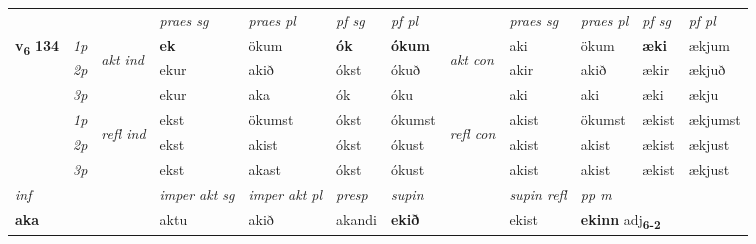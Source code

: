 \begin{longtable}[l]{X>{\footnotesize\itshape}llXXXXlXXXX}
 & &   & \textit{praes sg}  & \textit{praes pl}    & \textit{ pf sg} & \textit{pf pl} & & \textit{praes sg}  & \textit{praes pl}    & \textit{pf sg} & \textit{pf pl }  \\ \cmidrule{4-7} \cmidrule{9-12}
 \multirow{2}{*}{{{\textbf{v{\textsubscript{6}}} \Large{\textbf{134}}}}}  & 1p & \multirow{3}{*}{\begin{turn}{90}\textit{akt ind}\end{turn}} & \textbf{ek} & ökum & \textbf{ók} & \textbf{ókum} & \multirow{3}{*}{\begin{turn}{90}\textit{akt con}\end{turn}} &aki & ökum & \textbf{æki} & ækjum\\*
 & 2p &  &  ekur  & akið & ókst & ókuð & & akir & akið & ækir & ækjuð \\*
 & 3p &  & ekur & aka & ók & óku & & aki & aki& æki & ækju \\*
\cmidrule{4-7} \cmidrule{9-12}
 & 1p & \multirow{3}{*}{\begin{turn}{90}\textit{refl ind}\end{turn}}  & ekst & ökumst & ókst & ókumst & \multirow{3}{*}{\begin{turn}{90}\textit{refl con}\end{turn}}  &akist & ökumst & ækist & ækjumst \\*
 & 2p &  & ekst & akist & ókst & ókust & &akist & akist & ækist & ækjust \\*
 & 3p  & & ekst & akast & ókst & ókust & & akist & akist& ækist & ækjust \\*
\cmidrule{4-7} \cmidrule{9-12}

   {\textit{inf}} & &  & \textit{imper akt sg} & \textit{imper akt pl}   & \textit{presp} & \textit{supin} && \textit{supin refl} & \textit{pp m} \\*
  {\textbf{aka}} & && aktu  & akið   & akandi &  \textbf{ekið} && ekist & \multicolumn{2}{l}{\textbf{ekinn} adj\textbf{\textsubscript{6-2}}} \\*

\midrule


\end{longtable}
